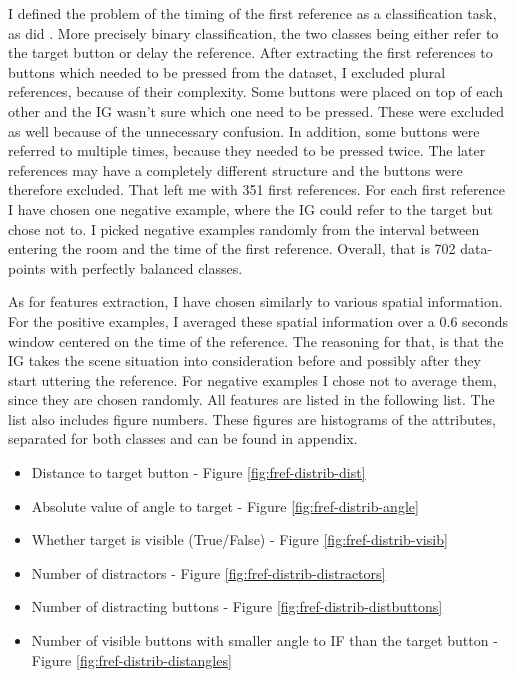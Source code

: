 I defined the problem of the timing of the first reference as a classification task, as did \citet{stoia2006sentence}. More precisely binary classification, the two classes being either refer to the target button or delay the reference. After extracting the first references to buttons which needed to be pressed from the dataset, I excluded plural references, because of their complexity. Some buttons were placed on top of each other and the IG wasn't sure which one need to be pressed. These were excluded as well because of the unnecessary confusion. In addition, some buttons were referred to multiple times, because they needed to be pressed twice. The later references may have a completely different structure and the buttons were therefore excluded. That left me with 351 first references. For each first reference I have chosen one negative example, where the IG could refer to the target but chose not to. I picked negative examples randomly from the interval between entering the room and the time of the first reference. Overall, that is 702 data-points with perfectly balanced classes.

As for features extraction, I have chosen similarly to \citet{stoia2006sentence} various spatial information. For the positive examples, I averaged these spatial information over a 0.6 seconds window centered on the time of the reference. The reasoning for that, is that the IG takes the scene situation into consideration before and possibly after they start uttering the reference. For negative examples I chose not to average them, since they are chosen randomly. All features are listed in the following list. The list also includes figure numbers. These figures are histograms of the attributes, separated for both classes and can be found in appendix.

\begin{itemize}
\item
Distance to target button - Figure \ref{fig:fref-distrib-dist}
\item
Absolute value of angle to target - Figure \ref{fig:fref-distrib-angle}
\item
Whether target is visible (True/False) - Figure \ref{fig:fref-distrib-visib}
\item
Number of distractors - Figure \ref{fig:fref-distrib-distractors}
\item
Number of distracting buttons - Figure \ref{fig:fref-distrib-distbuttons}
\item
Number of visible buttons with smaller angle to IF than the target button - Figure \ref{fig:fref-distrib-distangles}
\end{itemize}

